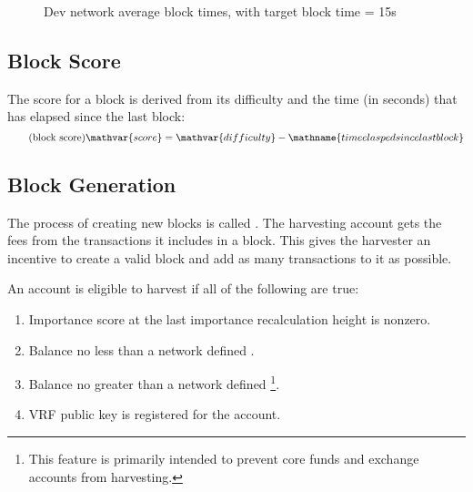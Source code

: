 \begin{figure}
	\caption{Dev network average block times, with target block time = 15s}
\end{figure}

\subsection{Block Score}
\label{sec:blockchain:blockScore}
\label{sec:blockchain:score}

The score for a block is derived from its difficulty and the time (in seconds) that has elapsed since the last block:
\begin{equation}
	\tag{block score} \mathvar{score} = \mathvar{difficulty} - \mathname{time elasped since last block}
\end{equation}

\subsection{Block Generation}
\label{sec:blockchain:generation}

The process of creating new blocks is called .
The harvesting account gets the fees from the transactions it includes in a block.
This gives the harvester an incentive to create a valid block and add as many transactions to it as possible.

An account is eligible to harvest if all of the following are true:
\begin{enumerate}
	\item{Importance score at the last importance recalculation height is nonzero.}
	\item{Balance no less than a network defined .}
	\item{
		Balance no greater than a network defined 
		\footnote{This feature is primarily intended to prevent core funds and exchange accounts from harvesting.}.
	}
	\item{VRF public key is registered for the account.}
\end{enumerate}

